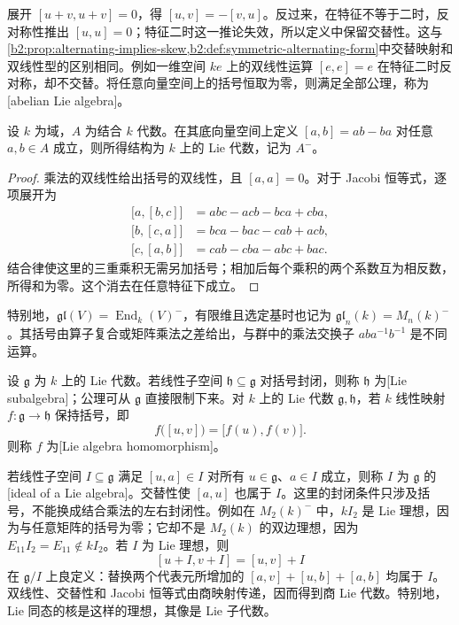 展开 \([u+v,u+v]=0\)，得 \([u,v]=-[v,u]\)。反过来，在特征不等于二时，反对称性推出 \([u,u]=0\)；特征二时这一推论失效，所以定义中保留交替性。这与\cref{b2:prop:alternating-implies-skew,b2:def:symmetric-alternating-form}中交替映射和双线性型的区别相同。例如一维空间 \(ke\) 上的双线性运算 \([e,e]=e\) 在特征二时反对称，却不交替。将任意向量空间上的括号恒取为零，则满足全部公理，称为[abelian Lie algebra]。

\begin{proposition}\label{b2:prop:commutator-lie-algebra}
	设 \(k\) 为域，\(A\) 为结合 \(k\) 代数。在其底向量空间上定义 \([a,b]=ab-ba\) 对任意 \(a,b\in A\) 成立，则所得结构为 \(k\) 上的 Lie 代数，记为 \(A^-\)。
\end{proposition}
\begin{proof}
	乘法的双线性给出括号的双线性，且 \([a,a]=0\)。对于 Jacobi 恒等式，逐项展开为
	\[
		\begin{aligned}
			\bigl[a,[b,c]\bigr]&=abc-acb-bca+cba,\\
			\bigl[b,[c,a]\bigr]&=bca-bac-cab+acb,\\
			\bigl[c,[a,b]\bigr]&=cab-cba-abc+bac.
		\end{aligned}
	\]
	结合律使这里的三重乘积无需另加括号；相加后每个乘积的两个系数互为相反数，所得和为零。这个消去在任意特征下成立。
\end{proof}

特别地，\(\mathfrak{gl}(V)=\operatorname{End}_k(V)^-\)，有限维且选定基时也记为 \(\mathfrak{gl}_n(k)=M_n(k)^-\)。其括号由算子复合或矩阵乘法之差给出，与群中的乘法交换子 \(aba^{-1}b^{-1}\) 是不同运算。

\ProseParagraphBreak
设 \(\mathfrak g\) 为 \(k\) 上的 Lie 代数。若线性子空间 \(\mathfrak h\subseteq\mathfrak g\) 对括号封闭，则称 \(\mathfrak h\) 为[Lie subalgebra]；公理可从 \(\mathfrak g\) 直接限制下来。对 \(k\) 上的 Lie 代数 \(\mathfrak g,\mathfrak h\)，若 \(k\) 线性映射 \(f:\mathfrak g\to\mathfrak h\) 保持括号，即
\[
	f\bigl([u,v]\bigr)=\bigl[f(u),f(v)\bigr].
\]
则称 \(f\) 为[Lie algebra homomorphism]。

\ProseParagraphBreak
若线性子空间 \(I\subseteq\mathfrak g\) 满足 \([u,a]\in I\) 对所有 \(u\in\mathfrak g\)、\(a\in I\) 成立，则称 \(I\) 为 \(\mathfrak g\) 的[ideal of a Lie algebra]。交替性使 \([a,u]\) 也属于 \(I\)。这里的封闭条件只涉及括号，不能换成结合乘法的左右封闭性。例如在 \(M_2(k)^-\) 中，\(kI_2\) 是 Lie 理想，因为与任意矩阵的括号为零；它却不是 \(M_2(k)\) 的双边理想，因为 \(E_{11}I_2=E_{11}\notin kI_2\)。若 \(I\) 为 Lie 理想，则
\[
	[u+I,v+I]=[u,v]+I
\]
在 \(\mathfrak g/I\) 上良定义：替换两个代表元所增加的 \([a,v]+[u,b]+[a,b]\) 均属于 \(I\)。双线性、交替性和 Jacobi 恒等式由商映射传递，因而得到商 Lie 代数。特别地，Lie 同态的核是这样的理想，其像是 Lie 子代数。

